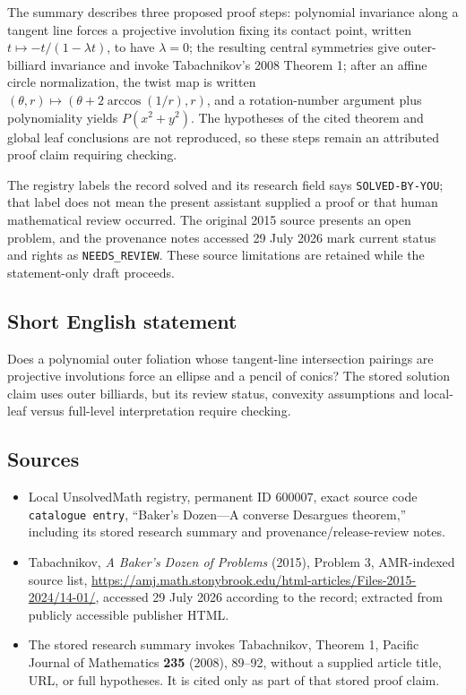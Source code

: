 \documentclass[11pt]{article}
\begin{document}
The summary describes three proposed proof steps: polynomial invariance along a tangent line forces a projective involution fixing its contact point, written $t\mapsto-t/(1-\lambda t)$, to have $\lambda=0$; the resulting central symmetries give outer-billiard invariance and invoke Tabachnikov's 2008 Theorem 1; after an affine circle normalization, the twist map is written $(\theta,r)\mapsto(\theta+2\arccos(1/r),r)$, and a rotation-number argument plus polynomiality yields $P(x^2+y^2)$. The hypotheses of the cited theorem and global leaf conclusions are not reproduced, so these steps remain an attributed proof claim requiring checking.

The registry labels the record solved and its research field says \texttt{SOLVED-BY-YOU}; that label does not mean the present assistant supplied a proof or that human mathematical review occurred. The original 2015 source presents an open problem, and the provenance notes accessed 29 July 2026 mark current status and rights as \texttt{NEEDS\_REVIEW}. These source limitations are retained while the statement-only draft proceeds.
\subsection{Short English statement}
Does a polynomial outer foliation whose tangent-line intersection pairings are projective involutions force an ellipse and a pencil of conics? The stored solution claim uses outer billiards, but its review status, convexity assumptions and local-leaf versus full-level interpretation require checking.
\subsection{Sources}
\begin{itemize}
\item Local UnsolvedMath registry, permanent ID $600007$, exact source code \texttt{catalogue entry}, ``Baker's Dozen---A converse Desargues theorem,'' including its stored research summary and provenance/release-review notes.
\item Tabachnikov, \emph{A Baker's Dozen of Problems} (2015), Problem 3, AMR-indexed source list, \url{https://amj.math.stonybrook.edu/html-articles/Files-2015-2024/14-01/}, accessed 29 July 2026 according to the record; extracted from publicly accessible publisher HTML.
\item The stored research summary invokes Tabachnikov, Theorem 1, Pacific Journal of Mathematics \textbf{235} (2008), 89--92, without a supplied article title, URL, or full hypotheses. It is cited only as part of that stored proof claim.
\end{itemize}
\end{document}
